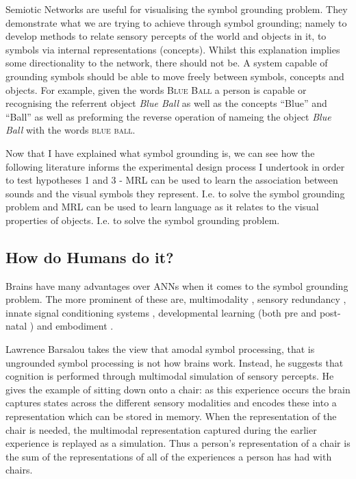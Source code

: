 Semiotic Networks are useful for visualising the symbol grounding problem. They demonstrate what we are trying to achieve through symbol grounding; namely to develop methods to relate sensory percepts of the world and objects in it, to symbols via internal representations (concepts). Whilst this explanation implies some directionality to the network, there should not be. A system capable of grounding symbols should be able to move freely between symbols, concepts and objects. For example, given the words \textsc{Blue Ball} a person is capable or recognising the referrent object  \textit{Blue Ball} as well as the concepts ``Blue'' and ``Ball'' as well as preforming the reverse operation of nameing the object \textit{Blue Ball} with the words \textsc{blue ball}.

Now that I have explained what symbol grounding is, we can see how the following literature informs the experimental design process I undertook in order to test hypotheses 1 and 3 - \ac{MRL} can be used to learn the association between sounds and the visual symbols they represent. I.e. to solve the symbol grounding problem and \ac{MRL} can be used to learn language as it relates to the visual properties of objects. I.e. to solve the symbol grounding problem.


\subsection{How do Humans do it?}
Brains have many advantages over \acp{ANN} when it comes to the symbol grounding problem. The more prominent of these are, multimodality \cite{barsalou2008grounded}, sensory redundancy \cite{slater1999intermodal}, innate signal conditioning systems \cite{masland2012neuronal, fantz1963pattern, johnson2015two}, developmental learning (both pre \cite{webb2015mother, reid2017human} and post-natal \cite{johnson2015two}) and embodiment \cite{pfeifer2006body, smith2005development}.

Lawrence Barsalou \cite{barsalou2008grounded} takes the view that amodal symbol processing, that is ungrounded symbol processing is not how brains work. Instead, he suggests that cognition is performed through multimodal simulation of sensory percepts. He gives the example of sitting down onto a chair: as this experience occurs the brain captures states across the different sensory modalities and encodes these into a representation which can be stored in memory. When the representation of the chair is needed, the multimodal representation captured during the earlier experience is replayed as a simulation. Thus a person's representation of a chair is the sum of the representations of all of the experiences a person has had with chairs. 

